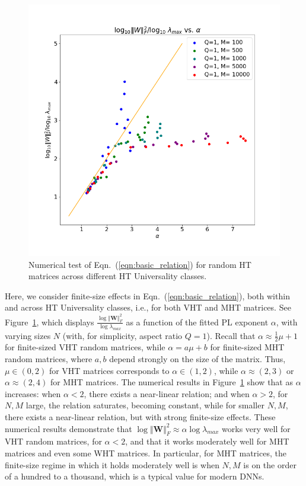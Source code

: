 \begin{figure}[t] %
   \centering
   \includegraphics[scale=0.30]{img/Alpha-LogNorm-Relations.png}
   \caption{
            Numerical test of Eqn.~(\ref{eqn:basic_relation}) for random HT matrices across different HT Universality classes.
           }
   \label{fig:randW}
\end{figure}

Here, we consider finite-size effects in Eqn.~(\ref{eqn:basic_relation}), both within and across HT Universality classes, i.e., for both VHT and MHT matrices.
See Figure~\ref{fig:randW}, which  displays $\frac{\log\Vert\mathbf{W}\Vert^{2}_{F}}{\log\lambda_{max}}$ as a function of the fitted PL exponent $\alpha$, with varying sizes $N$ (with, for simplicity, aspect ratio $Q=1$).
Recall that $\alpha \approx \frac{1}{2}\mu+1$ for finite-sized VHT random matrices, while $\alpha = a\mu+b$ for finite-sized MHT random matrices, where $a,b$ depend strongly on the size of the matrix.  Thus, $\mu\in(0,2)$ for VHT matrices corresponds to $\alpha\in(1,2)$, while $\alpha \approx(2,3)$ or $\alpha \approx(2,4)$ for MHT matrices.
The numerical results in Figure~\ref{fig:randW} show that as $\alpha$ increases:
when $\alpha<2$, there exists a near-linear relation; and
when $\alpha>2$, for $N,M$ large, the relation saturates, becoming constant, while for smaller $N,M$, there exists a near-linear relation, but with strong finite-size effects.
These numerical results demonstrate that $ \log\Vert\mathbf{W}\Vert^{2}_{F}\approx\alpha\log\lambda_{max} $ works very well for VHT random matrices, for $\alpha<2$, and that it works moderately well for MHT matrices and even some WHT matrices.
In particular, for MHT matrices, the finite-size regime in which it holds moderately well is when $N,M$ is on the order of a hundred to a thousand, which is a typical value for modern DNNs. 

